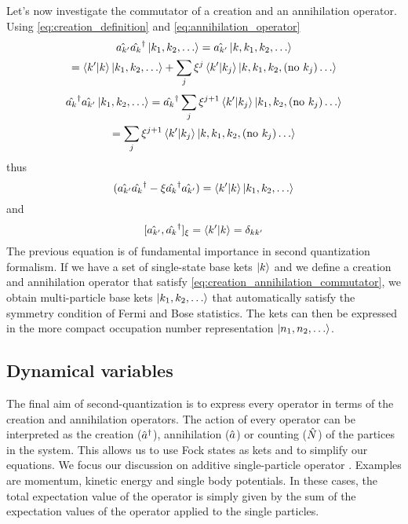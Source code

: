 Let's now investigate the commutator of a creation and an annihilation operator. Using \cref{eq:creation_definition} and  \cref{eq:annihilation_operator}
\begin{multline}
    \hat{a_{k'}}\hat{a_{k}}^\dagger \ket{k_1, k_2, \dots}
    = \hat{a_{k'}} \ket{k,k_1, k_2, \dots}
    \\= \braket{k'}{k} \ket{k_1, k_2, \dots}
    +    \sum_{j} \xi^{j} \braket{k'}{k_j} \ket{k,k_1, k_2, (\text{no } k_j) \dots}
\end{multline}
\begin{multline}
    \hat{a_{k}}^\dagger\hat{a_{k'}} \ket{k_1, k_2, \dots}
    = \hat{a_{k}}^\dagger \sum_{j} \xi^{j+1} \braket{k'}{k_j} \ket{k_1, k_2, (\text{no } k_j) \dots}
    \\= \sum_{j} \xi^{j+1} \braket{k'}{k_j} \ket{k,k_1, k_2, (\text{no } k_j) \dots}
\end{multline}
thus
\begin{equation}
    (\hat{a_{k'}}\hat{a_{k}}^\dagger -\xi  \hat{a_{k}}^\dagger\hat{a_{k'}}) = \braket{k'}{k} \ket{k_1, k_2, \dots}
\end{equation}
and
\begin{equation} \label{eq:creation_annihilation_commutator}
    [\hat{a_{k'}}, \hat{a_k}^\dagger]_\xi = \braket{k'}{k} = \delta_{kk'}
\end{equation}
The previous equation is of fundamental importance in second quantization formalism. If we have a set of single-state base kets $\ket{k}$ and we define a creation and annihilation operator that satisfy \cref{eq:creation_annihilation_commutator}, we obtain multi-particle base kets $\ket{k_1, k_2, \dots}$ that automatically satisfy the symmetry condition of Fermi and Bose statistics. The kets can then be expressed in the more compact occupation number representation $\ket{n_{1}, n_{2}, \dots}$.

\subsection{Dynamical variables}
The final aim of second-quantization is to express every operator in terms of the creation and annihilation operators. The action of every operator can be interpreted as the creation ($\hat{a}^\dagger$), annihilation ($\hat{a}$) or counting ($\hat{N}$) of the partices in the system. This allows us to use Fock states as kets and to simplify our equations.
We focus our discussion on additive single-particle operator \cite{sakurai2020}. Examples are momentum, kinetic energy and single body potentials. In these cases, the total expectation value of the operator is simply given by the sum of the expectation values of the operator applied to the single particles.

